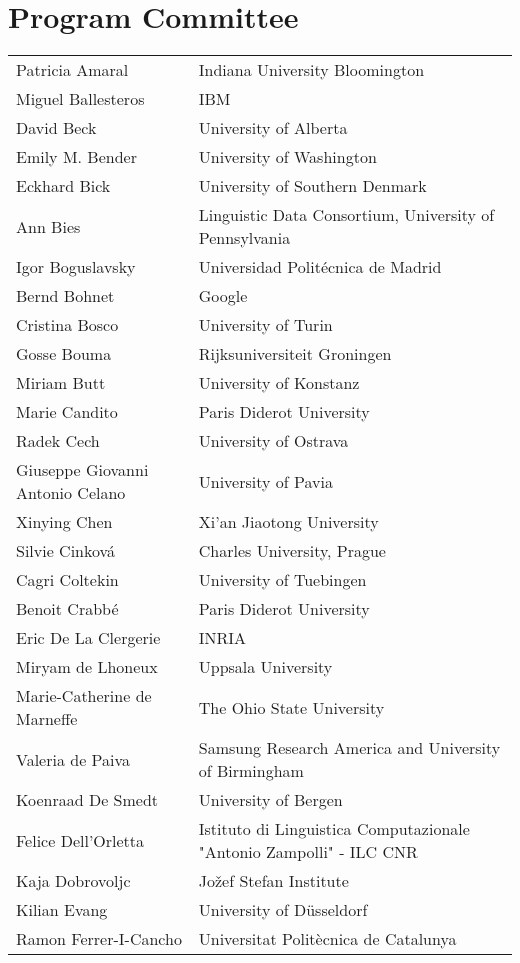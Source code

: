 \documentclass{easychair}
\begin{document}
\section*{Program Committee}
\noindent
\begin{longtable}{p{}p{}}
Patricia Amaral & Indiana University Bloomington\\
Miguel Ballesteros & IBM\\
David Beck & University of Alberta\\
Emily M. Bender & University of Washington\\
Eckhard Bick & University of Southern Denmark\\
Ann Bies & Linguistic Data Consortium, University of Pennsylvania\\
Igor Boguslavsky & Universidad Polit\'ecnica de Madrid\\
Bernd Bohnet & Google\\
Cristina Bosco & University of Turin\\
Gosse Bouma & Rijksuniversiteit Groningen\\
Miriam Butt & University of Konstanz\\
Marie Candito & Paris Diderot University\\
Radek Cech & University of Ostrava\\
Giuseppe Giovanni Antonio Celano & University of Pavia\\
Xinying Chen & Xi'an Jiaotong University\\
Silvie Cinkov\'a & Charles University, Prague\\
Cagri Coltekin & University of Tuebingen\\
Benoit Crabb\'e & Paris Diderot University\\
Eric De La Clergerie & INRIA\\
Miryam de Lhoneux & Uppsala University\\
Marie-Catherine de Marneffe & The Ohio State University\\
Valeria de Paiva & Samsung Research America and  University of Birmingham\\
Koenraad De Smedt & University of Bergen\\
Felice Dell'Orletta & Istituto di Linguistica Computazionale "Antonio Zampolli" - ILC CNR\\
Kaja Dobrovoljc & Jo\v{z}ef Stefan Institute\\
Kilian Evang & University of D\"usseldorf\\
Ramon Ferrer-I-Cancho & Universitat Polit\`ecnica de Catalunya\\

\end{longtable}
\end{document}
